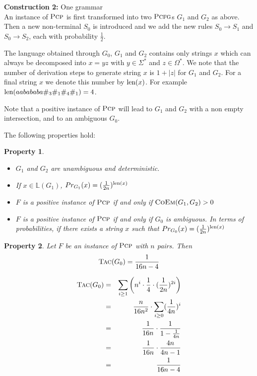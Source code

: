 \documentclass[submission]{eptcs} \usepackage{breakurl}             \usepackage[english]{babel}
\newtheorem{property}{Property}
\providecommand{\PCFG}{\ensuremath{\textsc{Pcfg}}}
\providecommand{\TAC}{\ensuremath{\textsc{Tac}}}
\providecommand{\PCP}{\ensuremath{\textsc{Pcp}}}
\providecommand{\Naming}{\ensuremath{\mathbb L}}
\providecommand{\Prob}{\ensuremath{Pr}}
\providecommand{\len}{\textup{len}}
\providecommand{\COEM}{\ensuremath{\textsc{CoEm}}}
\providecommand{\gives}{\ensuremath{\mathop{\rightarrow}}}
\begin{document}
\vspace{0.1in}
\noindent\textbf{Construction 2:} One grammar  \\
An instance of $\PCP$ is first transformed into two $\PCFG$s $G_1$ and $G_2$ as above.
Then a new non-terminal $S_0$ is introduced and we add the new rules $S_0\gives S_1$ and $S_0\gives S_2$, each with probability $\frac{1}{2}$.

\vspace{0.1in}
The language obtained through $G_0$, $G_1$ and $G_2$ contains only strings $x$ which can always be decomposed into $x=yz$ with $y\in\Sigma^*$ and $z\in\Omega^*$. We note that the number of  derivation steps to generate string $x$ is $1+|z|$ for $G_1$ and $G_2$. For a final string $x$ we denote this number by $\len(x)$. For example $\len(aabababa\#_3\#_1\#_4\#_1)=4$.

Note that a positive instance of $\PCP$ will lead to $G_1$ and $G_2$ with a non empty intersection, and to an ambiguous $G_0$.

The following properties hold:

\begin{property}~
\begin{itemize}
\item $G_1$ and $G_2$ are unambiguous and deterministic.
\item If $x\in \Naming(G_1)$, $\Prob_{G_1}(x)=(\frac{1}{2n})^{\len(x)}$
\item $F$ is a positive instance of $\PCP$ if and only if $\COEM(G_1,G_2)>0$
\item $F$ is a positive instance of $\PCP$ if and only if $G_0$ is ambiguous. In terms of probabilities, if there exists a string $x$ such that $\Prob_{G_0}(x)=(\frac{1}{2n})^{\len(x)}$
\end{itemize}
\end{property}

\begin{property}\label{tac_for_pcp}
Let $F$ be an instance of $\PCP$ with $n$ pairs. Then
$$
\TAC(G_0)=\frac{1}{16n-4}
$$
\end{property}
\begin{eqnarray*}
\TAC(G_0)&=&\sum_{i\ge 1}\bigg(n^i\cdot\frac{1}{4}\cdot(\frac{1}{2n})^{2i}\bigg)\\
&=&\frac{n}{16n^2}\cdot\sum_{i\ge 0}(\frac{1}{4n})^i\\
&=&\frac{1}{16n}\cdot\frac{1}{1-\frac{1}{4n}}\\
&=&\frac{1}{16n}\cdot\frac{4n}{4n-1}\\
&=&\frac{1}{16n-4}
\end{eqnarray*}
\end{document}
